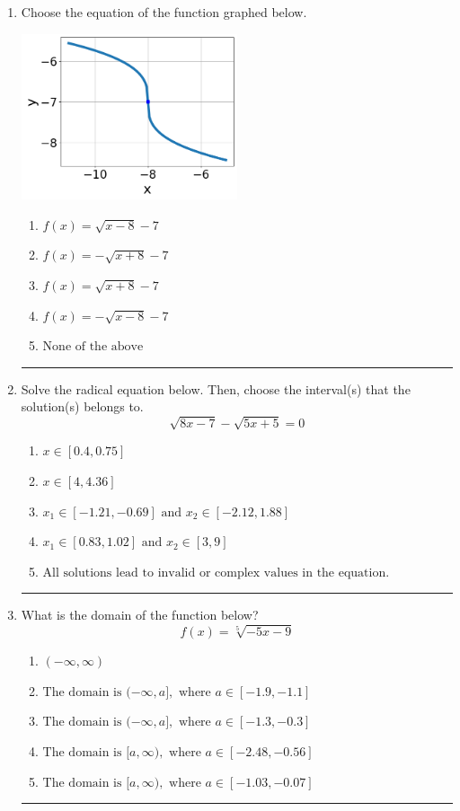\documentclass[14pt]{extbook}
\newcommand{\litem}[1]{\item#1\hspace*{-1cm}\rule{\textwidth}{0.4pt}}
\begin{document}
\begin{enumerate}
{\begin{enumerate}[label=\Alph*.]
\end{enumerate} }
\litem{
Choose the equation of the function graphed below.
\begin{center}
    \includegraphics[width=0.5\textwidth]{../Figures/radicalGraphToEquationCopyA.png}
\end{center}
\begin{enumerate}[label=\Alph*.]
\item \( f(x) = \sqrt{x - 8} - 7 \)
\item \( f(x) = - \sqrt{x + 8} - 7 \)
\item \( f(x) = \sqrt{x + 8} - 7 \)
\item \( f(x) = - \sqrt{x - 8} - 7 \)
\item \( \text{None of the above} \)

\end{enumerate} }
\litem{
Solve the radical equation below. Then, choose the interval(s) that the solution(s) belongs to.\[ \sqrt{8 x - 7} - \sqrt{5 x + 5} = 0 \]\begin{enumerate}[label=\Alph*.]
\item \( x \in [0.4,0.75] \)
\item \( x \in [4,4.36] \)
\item \( x_1 \in [-1.21, -0.69] \text{ and } x_2 \in [-2.12,1.88] \)
\item \( x_1 \in [0.83, 1.02] \text{ and } x_2 \in [3,9] \)
\item \( \text{All solutions lead to invalid or complex values in the equation.} \)

\end{enumerate} }
\litem{
What is the domain of the function below?\[ f(x) = \sqrt[5]{-5 x - 9} \]\begin{enumerate}[label=\Alph*.]
\item \( (-\infty, \infty) \)
\item \( \text{The domain is } (-\infty, a], \text{   where } a \in [-1.9, -1.1] \)
\item \( \text{The domain is } (-\infty, a], \text{   where } a \in [-1.3, -0.3] \)
\item \( \text{The domain is } [a, \infty), \text{   where } a \in [-2.48, -0.56] \)
\item \( \text{The domain is } [a, \infty), \text{   where } a \in [-1.03, -0.07] \)


\end{enumerate}}
\end{enumerate}
\end{document}
